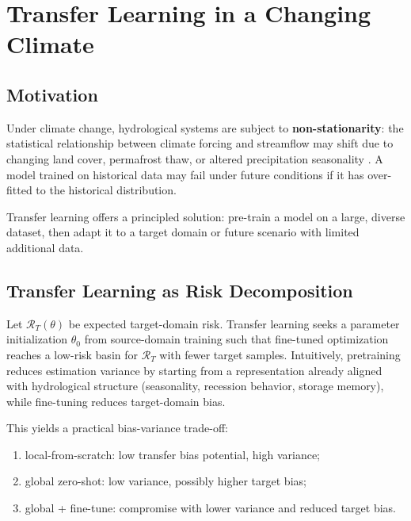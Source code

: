 \documentclass[
]{krantz}
\providecommand{\tightlist}{%
  \setlength{\itemsep}{0pt}\setlength{\parskip}{0pt}}
\begin{document}
\section{Transfer Learning in a Changing Climate}\label{nh-transfer}

\subsection{Motivation}\label{motivation}

Under climate change, hydrological systems are subject to \textbf{non-stationarity}: the
statistical relationship between climate forcing and streamflow may shift due to
changing land cover, permafrost thaw, or altered precipitation seasonality
\citep{milly2008}. A model trained on historical data may fail under future conditions if it
has over-fitted to the historical distribution.

Transfer learning offers a principled solution: pre-train a model on a large, diverse
dataset, then adapt it to a target domain or future scenario with limited additional
data.

\subsection{Transfer Learning as Risk Decomposition}\label{transfer-learning-as-risk-decomposition}

Let \(\mathcal{R}_T(\theta)\) be expected target-domain risk. Transfer learning seeks a
parameter initialization \(\theta_0\) from source-domain training such that fine-tuned
optimization reaches a low-risk basin for \(\mathcal{R}_T\) with fewer target samples.
Intuitively, pretraining reduces estimation variance by starting from a representation
already aligned with hydrological structure (seasonality, recession behavior, storage
memory), while fine-tuning reduces target-domain bias.

This yields a practical bias-variance trade-off:

\begin{enumerate}
\def\labelenumi{\arabic{enumi}.}
\tightlist
\item
  local-from-scratch: low transfer bias potential, high variance;
\item
  global zero-shot: low variance, possibly higher target bias;
\item
  global + fine-tune: compromise with lower variance and reduced target bias.
\end{enumerate}
\end{document}
